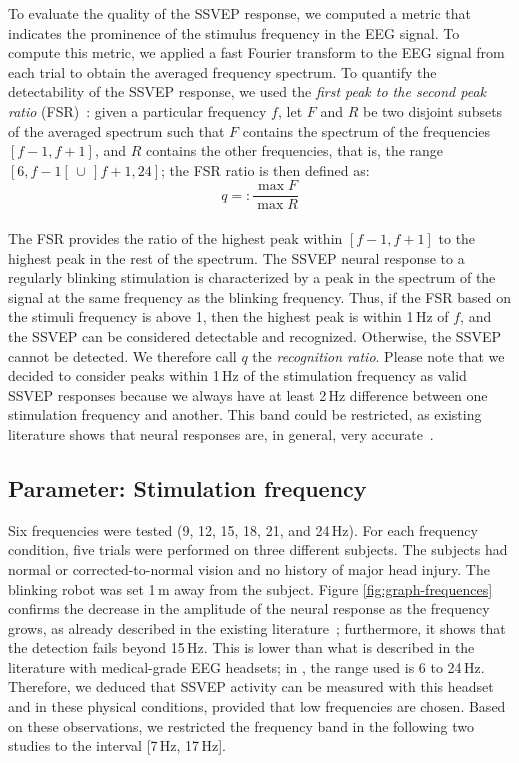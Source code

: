 \documentclass[smallextended]{svjour3}
\begin{document}
To evaluate the quality of the SSVEP response, we computed a metric that indicates the prominence of the stimulus frequency in the EEG signal.
To compute this metric, we applied a fast Fourier transform to the EEG signal from each trial to obtain the averaged frequency spectrum. 
To quantify the detectability of the SSVEP response, we used the \textit{first peak to the second peak ratio} (FSR)~\cite{Zheng2010}:
given a particular frequency $f$, let $F$ and $R$ be two disjoint subsets of the averaged spectrum such that $F$ contains the spectrum of the frequencies $[f-1, f+1]$, and $R$ contains the other frequencies, that is, the range $[6, f-1[ \,\cup\, ]f+1, 24]$; the FSR ratio is then defined as:
\begin{equation}
\label{recog_rat}
q =:\frac{\max F}{\max R}
\end{equation}
\\
The FSR provides the ratio of the highest peak within $[f-1, f+1]$ to the highest peak in the rest of the spectrum. 
The SSVEP neural response to a regularly blinking stimulation is characterized by a peak in the spectrum of the signal at the same frequency as the blinking frequency. 
Thus, if the FSR based on the stimuli frequency is above 1, then the highest peak is within 1\,Hz of $f$, and the SSVEP can be considered detectable and recognized. 
Otherwise, the SSVEP cannot be detected. 
We therefore call $q$ the \textit{recognition ratio}.
Please note that we decided to consider peaks within 1\,Hz of the stimulation frequency as valid SSVEP responses because we always have at least 2\,Hz difference between one stimulation frequency and another. 
This band could be restricted, as existing literature shows that neural responses are, in general, very accurate~\cite{SSVEPfiability}.

\subsection{Parameter: Stimulation frequency}
Six frequencies were tested (9, 12, 15, 18, 21, and 24\,Hz). For each frequency condition, five trials were performed on three different subjects. The subjects had normal or corrected-to-normal vision and no history of major head injury. The blinking robot was set 1\,m away from the subject. 
Figure \ref{fig:graph-frequences} confirms the decrease in the amplitude of the neural response as the frequency grows, as already described in the existing literature~\cite{herrmann2001}; furthermore, it shows that the detection fails beyond 15\,Hz. 
This is lower than what is described in the literature with medical-grade EEG headsets; in \cite{SSVEPfiability}, the range used is 6 to 24\,Hz. Therefore, we deduced that SSVEP activity can be measured with this headset and in these physical conditions, provided that low frequencies are chosen.
Based on these observations, we restricted the frequency band in the following two studies to the interval [7\,Hz, 17\,Hz].
\end{document}
